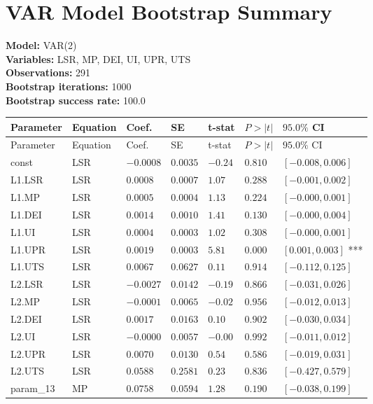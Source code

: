 \documentclass{article}
\begin{document}
\section*{VAR Model Bootstrap Summary}
\textbf{Model:} VAR(2)\\
\textbf{Variables:} LSR, MP, DEI, UI, UPR, UTS\\
\textbf{Observations:} 291\\
\textbf{Bootstrap iterations:} 1000\\
\textbf{Bootstrap success rate:} 100.0%
\bigskip
\begin{longtable}{lllllll}
\toprule
Parameter & Equation & Coef. & SE & t-stat & $P{>}|t|$ & $95.0\%$ CI \\
\midrule
\endfirsthead
\toprule
Parameter & Equation & Coef. & SE & t-stat & $P{>}|t|$ & $95.0\%$ CI \\
\midrule
\endhead
const & LSR & $-0.0008$ & $0.0035$ & $-0.24$ & $0.810$ & $[-0.008, 0.006]$  \\
L1.LSR & LSR & $0.0008$ & $0.0007$ & $1.07$ & $0.288$ & $[-0.001, 0.002]$  \\
L1.MP & LSR & $0.0005$ & $0.0004$ & $1.13$ & $0.224$ & $[-0.000, 0.001]$  \\
L1.DEI & LSR & $0.0014$ & $0.0010$ & $1.41$ & $0.130$ & $[-0.000, 0.004]$  \\
L1.UI & LSR & $0.0004$ & $0.0003$ & $1.02$ & $0.308$ & $[-0.000, 0.001]$  \\
L1.UPR & LSR & $0.0019$ & $0.0003$ & $5.81$ & $0.000$ & $[0.001, 0.003]$ *** \\
L1.UTS & LSR & $0.0067$ & $0.0627$ & $0.11$ & $0.914$ & $[-0.112, 0.125]$  \\
L2.LSR & LSR & $-0.0027$ & $0.0142$ & $-0.19$ & $0.866$ & $[-0.031, 0.026]$  \\
L2.MP & LSR & $-0.0001$ & $0.0065$ & $-0.02$ & $0.956$ & $[-0.012, 0.013]$  \\
L2.DEI & LSR & $0.0017$ & $0.0163$ & $0.10$ & $0.902$ & $[-0.030, 0.034]$  \\
L2.UI & LSR & $-0.0000$ & $0.0057$ & $-0.00$ & $0.992$ & $[-0.011, 0.012]$  \\
L2.UPR & LSR & $0.0070$ & $0.0130$ & $0.54$ & $0.586$ & $[-0.019, 0.031]$  \\
L2.UTS & LSR & $0.0588$ & $0.2581$ & $0.23$ & $0.836$ & $[-0.427, 0.579]$  \\
param\_13 & MP & $0.0758$ & $0.0594$ & $1.28$ & $0.190$ & $[-0.038, 0.199]$  \\

\end{longtable}
\end{document}
